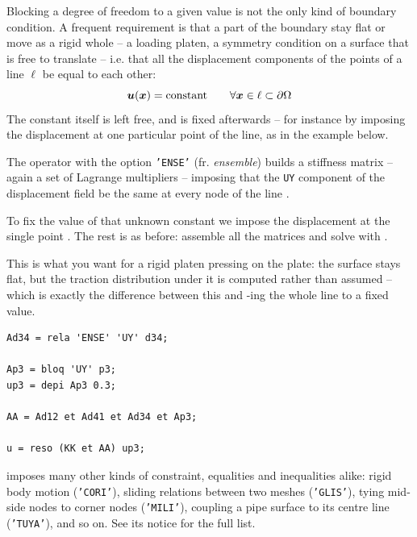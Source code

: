 Blocking a degree of freedom to a given value is not the only kind of boundary
condition. %
A frequent requirement is that a part of the boundary stay flat or
move as a rigid whole -- a loading platen, a symmetry condition on a surface
that is free to translate -- i.e. that all the displacement components of the
points of a line $\ell$ be equal to each other:
\begin{equation}
   \bm{u}(\bm{x}) = \text{constant}
   \qquad \forall \bm{x} \in \ell \subset \partial \Omega
\end{equation}
The constant itself is left free, and is fixed afterwards -- for instance by
imposing the displacement at one particular point of the line, as in the
example below.


\begin{castemcom}
The operator  with the option \texttt{'ENSE'}
(fr. \emph{ensemble}) builds a stiffness matrix -- again a set of Lagrange
multipliers -- imposing that the \texttt{UY} component of the displacement
field be the same at every node of the line .

To fix the value of that unknown constant we impose the displacement at the
single point . The rest is as before: assemble all the matrices and
solve with .

\medskip
This is what you want for a rigid platen pressing on the plate: the surface
stays flat, but the traction distribution under it is computed rather than
assumed -- which is exactly the difference between this and -ing the
whole line to a fixed value.
\end{castemcom}
\begin{castemlines}
\begin{verbatim}
Ad34 = rela 'ENSE' 'UY' d34;

Ap3 = bloq 'UY' p3;
up3 = depi Ap3 0.3;

AA = Ad12 et Ad41 et Ad34 et Ap3;

u = reso (KK et AA) up3;
\end{verbatim}
\end{castemlines}

\noindent {} imposes many other kinds of constraint, equalities
and inequalities alike: rigid body motion (\texttt{'CORI'}), sliding relations
between two meshes (\texttt{'GLIS'}), tying mid-side nodes to corner nodes
(\texttt{'MILI'}), coupling a pipe surface to its centre line
(\texttt{'TUYA'}), and so on. See its notice for the full list.

